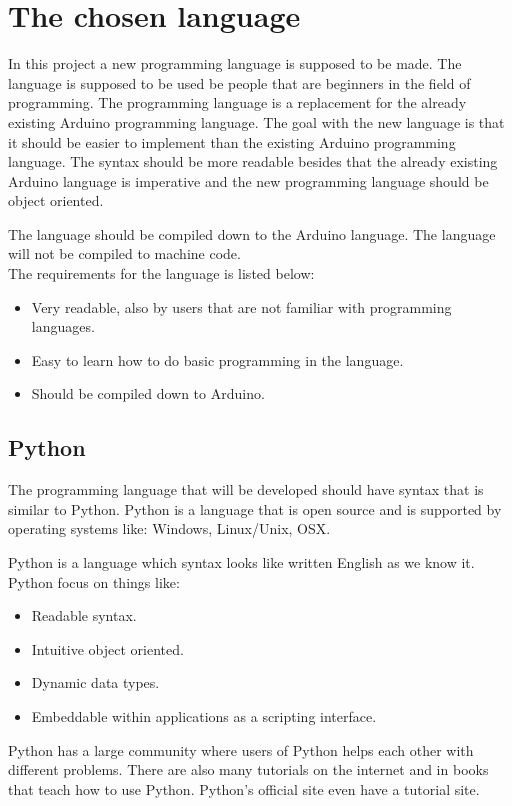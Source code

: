 \section{The chosen language}
In this project a new programming language is supposed to be made. The language is supposed to be used be people that are beginners in the field of programming. The programming language is a replacement for the already existing Arduino programming language. 
The goal with the new language is that it should be easier to implement than the existing Arduino programming language. The syntax should be more readable besides that the already existing Arduino language is imperative and the new programming language should be object oriented. 

The language should be compiled down to the Arduino language. The language will not be compiled to machine code. \\

The requirements for the language is listed below:
\begin{itemize}
	\item Very readable, also by users that are not familiar with programming languages.
	\item Easy to learn how to do basic programming in the language.
	\item Should be compiled down to Arduino.
\end{itemize}

\subsection{Python}
The programming language that will be developed should have syntax that is similar to Python. Python is a language that is open source and is supported by operating systems like: Windows, Linux/Unix, OSX.

Python is a language which syntax looks like written English as we know it.
Python focus on things like:

\begin{itemize}
	\item Readable syntax.
	\item Intuitive object oriented.
	\item Dynamic data types.
	\item Embeddable within applications as a scripting interface.
\end{itemize} 
\cite{python:official:about}
Python has a large community where users of Python helps each other with different problems. There are also many tutorials on the internet and in books that teach how to use Python. Python's official site even have a tutorial site.\cite{python:official:tutorial}
